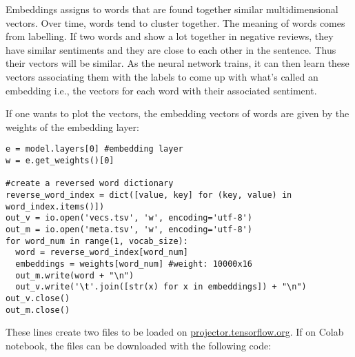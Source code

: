 Embeddings assigns to words that are found together similar multidimensional vectors. Over time, words tend to  cluster together. The meaning of words comes from labelling. If two words  and  show a lot together in negative reviews, they have similar sentiments and they are close to each other in the sentence. Thus their vectors will be similar. As the neural network trains, it can then learn these vectors associating them with the labels to come up with what's called an embedding i.e., the vectors for each word with their associated sentiment.

If one wants to plot the vectors, the embedding vectors of words are given by the weights of the embedding layer:
\begin{lstlisting}
e = model.layers[0] #embedding layer
w = e.get_weights()[0]

#create a reversed word dictionary
reverse_word_index = dict([value, key] for (key, value) in word_index.items()])
out_v = io.open('vecs.tsv', 'w', encoding='utf-8')
out_m = io.open('meta.tsv', 'w', encoding='utf-8')
for word_num in range(1, vocab_size):
  word = reverse_word_index[word_num]
  embeddings = weights[word_num] #weight: 10000x16
  out_m.write(word + "\n")
  out_v.write('\t'.join([str(x) for x in embeddings]) + "\n")
out_v.close()
out_m.close()
\end{lstlisting}
These lines create two files to be loaded on \url{projector.tensorflow.org}. If on Colab notebook, the files can be downloaded with the following code:
